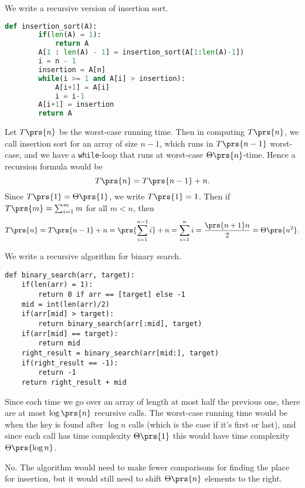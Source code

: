 \documentclass[oneside]{scrbook}
\newcommand{\codeword}[1]{\texttt{#1}}
\theoremstyle{definition}
\begin{document}
\begin{exercise}
    We write a recursive version of insertion sort.
    \begin{lstlisting}[language=Python]
    def insertion_sort(A):
        if(len(A) = 1):
            return A
        A[1 : len(A) - 1] = insertion_sort(A[1:len(A)-1])
        i = n - 1
        insertion = A[n]
        while(i >= 1 and A[i] > insertion):
            A[i+1] = A[i]
            i = i-1
        A[i+1] = insertion
        return A
    \end{lstlisting}

    Let $T\prs{n}$ be the worst-case running time. Then in computing $T\prs{n}$, we call insertion sort for an array of size $n-1$, which runs in $T\prs{n-1}$ worst-case, and we have a \codeword{while}-loop that runs at worst-case $\Theta\prs{n}$-time.
    Hence a recursion formula would be
    \[T\prs{n} = T\prs{n - 1} + n \text{.}\]
    Since $T\prs{1} = \Theta\prs{1}$, we write $T\prs{1} = 1$. Then if $T\prs{m} = \sum_{i = 1}^m m$ for all $m < n$, then
    \[T\prs{n} = T\prs{n-1} + n = \prs{\sum_{i=1}^{n-1} i} + n = \sum_{i=1}^n i = \frac{\prs{n+1}n}{2} = \Theta\prs{n^2} \text{.}\]
\end{exercise}

\begin{exercise}
    We write a recursive algorithm for binary search.
\begin{lstlisting}
def binary_search(arr, target):
	if(len(arr) = 1):
		return 0 if arr == [target] else -1
	mid = int(len(arr)/2)
	if(arr[mid] > target):
		return binary_search(arr[:mid], target)
	if(arr[mid] == target):
		return mid	
	right_result = binary_search(arr[mid:], target)
	if(right_result == -1):
		return -1
	return right_result + mid
\end{lstlisting}
Since each time we go over an array of length at most half the previous one, there are at most $\log\prs{n}$ recursive calls. The worst-case running time would be when the key is found after $\log n$ calls (which is the case if it's first or last), and since each call has time complexity $\Theta\prs{1}$ this would have time complexity $\Theta\prs{\log n}$.
\end{exercise}

\begin{exercise}
    No. The algorithm would need to make fewer comparisons for finding the place for insertion, but it would still need to shift $\Theta\prs{n}$ elements to the right.
\end{exercise}
\end{document}
